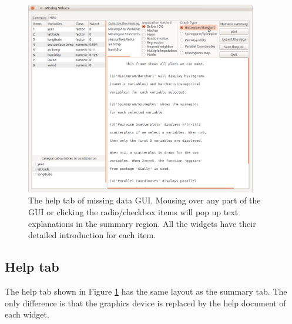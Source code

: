 \documentclass[english]{article}
\begin{document}
\begin{center}
%
\begin{figure}[h]
\begin{centering}
\includegraphics[width=0.9\textwidth]{Miss_fig7}
\par\end{centering}

\caption{The help tab of missing data GUI. Mousing over any part of the GUI or clicking the radio/checkbox items will pop up text explanations in the summary region. All the widgets have their detailed introduction for each item.}
\label{fig: missingGUI-help}
\end{figure}

\par\end{center}


\subsection{Help tab}

The help tab shown in Figure \ref{fig: missingGUI-help} has the same layout as the summary tab. The only difference is that the graphics device is replaced by the help document of each widget.
\end{document}
